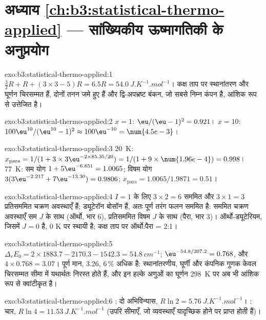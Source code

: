 \section*{अध्याय \ref{ch:b3:statistical-thermo-applied} --- सांख्यिकीय ऊष्मागतिकी के अनुप्रयोग}

\begin{solution}{exo:b3:statistical-thermo-applied:1}
$\frac32R + R + (3 \times 3 - 5)R = 6.5R = \qty{54.0}{J.K^{-1}.mol^{-1}}$। कक्ष ताप पर स्थानांतरण
और घूर्णन चिरसम्मत हैं, दोनों तनन जमे हुए हैं और द्वि-अपभ्रष्ट
बंकन, जो सबसे निम्न कंपन है, आंशिक रूप से उत्तेजित है।
\end{solution}

\begin{solution}{exo:b3:statistical-thermo-applied:2}
$x = 1$: $\eu/(\eu - 1)^2 = 0.921$। $x = 10$: $100\eu^{10}/(\eu^{10} - 1)^2 \approx 100\eu^{-10} = \num{4.5e-3}$।
\end{solution}

\begin{solution}{exo:b3:statistical-thermo-applied:3}
\qty{20}{K}: $x_{\mathrm{para}} = 1/(1 + 3 \times 3\eu^{-2 \times 85.35/20}) = 1/(1 + 9 \times \num{1.96e-4}) = 0.998$।
\qty{77}{K}: सम योग $1 + 5\eu^{-6.651} = 1.0065$; विषम योग $3(3\eu^{-2.217} + 7\eu^{-13.30}) = 0.9806$;
$x_{\mathrm{para}} = 1.0065/1.9871 = 0.51$।
\end{solution}

\begin{solution}{exo:b3:statistical-thermo-applied:4}
$I = 1$ के लिए $3 \times 2 = 6$ सममित और $3 \times 1 = 3$ प्रतिसममित चक्रण अवस्थाएँ हैं;
ड्यूटेरॉन बोसॉन हैं, अतः पूर्ण तरंग फलन सममित है: सममित चक्रण
अवस्थाएँ सम $J$ के साथ (ऑर्थो, भार 6), प्रतिसममित विषम $J$ के साथ (पैरा, भार
3)। ऑर्थो-ड्यूटेरियम, जिसमें $J = 0$ है, 0 K पर स्थायी है; कक्ष ताप पर
ऑर्थो:पैरा = 2:1।
\end{solution}

\begin{solution}{exo:b3:statistical-thermo-applied:5}
$\Delta_rE_0 = 2 \times 1883.7 - 2170.3 - 1542.3 = \qty{54.8}{cm^{-1}}$; $\eu^{-54.8/207.2} = 0.768$, और
$4 \times 0.768 = 3.07$। पूर्ण मान, 3.26, 6\,\% अधिक है: स्थानांतरणीय, घूर्णी और
कंपनिक गुणक केवल चिरसम्मत सीमा में यथार्थतः निरस्त होते हैं, और
इन हल्के अणुओं का घूर्णन \qty{298}{K} पर अब भी आंशिक रूप से क्वांटीकृत है।
\end{solution}

\begin{solution}{exo:b3:statistical-thermo-applied:6}
: दो अभिविन्यास, $R\ln2 = \qty{5.76}{J.K^{-1}.mol^{-1}}$। : चार, $R\ln4 =
\qty{11.53}{J.K^{-1}.mol^{-1}}$ (उपरि सीमाएँ, जो व्यवस्थाएँ यादृच्छिक होने पर प्राप्त होती हैं)।
\end{solution}

